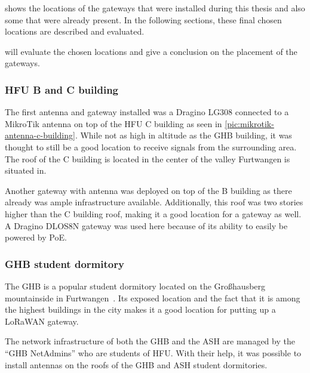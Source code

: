  shows the locations of the gateways that were installed during this thesis and also some that were already present.
In the following sections, these final chosen locations are described and evaluated.

 will evaluate the chosen locations and give a conclusion on the placement of the gateways.

\subsubsection{\ac{HFU} B and C building}

The first antenna and gateway installed was a Dragino LG308 connected to a MikroTik antenna on top of the \ac{HFU} C building as seen in \cref{pic:mikrotik-antenna-c-building}.
While not as high in altitude as the \ac{GHB} building, it was thought to still be a good location to receive signals from the surrounding area.
The roof of the C building is located in the center of the valley Furtwangen is situated in.

Another gateway with antenna was deployed on top of the B building as there already was ample infrastructure available.
Additionally, this roof was two stories higher than the C building roof, making it a good location for a gateway as well.
A Dragino DLOS8N gateway was used here because of its ability to easily be powered by \ac{PoE}.

\subsubsection{\acf{GHB} student dormitory}

The \ac{GHB} is a popular student dormitory located on the Großhausberg mountainside in Furtwangen~\cite{ghb_netadmins_student_2023}.
Its exposed location and the fact that it is among the highest buildings in the city makes it a good location for putting up a \ac{LoRaWAN} gateway.

The network infrastructure of both the \ac{GHB} and the \ac{ASH} are managed by the ``\ac{GHB} NetAdmins'' who are students of \ac{HFU}.
With their help, it was possible to install antennas on the roofs of the \ac{GHB} and \ac{ASH} student dormitories.

